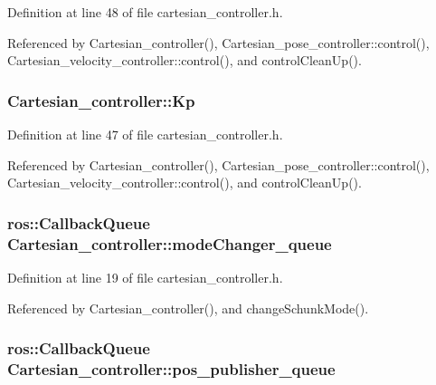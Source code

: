 Definition at line 48 of file cartesian\-\_\-controller.\-h.



Referenced by Cartesian\-\_\-controller(), Cartesian\-\_\-pose\-\_\-controller\-::control(), Cartesian\-\_\-velocity\-\_\-controller\-::control(), and control\-Clean\-Up().

\hypertarget{classCartesian__controller_a78073f51064a05d72c41723a93d9079f}{
\subsubsection[{Kp}]{ Cartesian\-\_\-controller\-::\-Kp\hspace{0.3cm}{\ttfamily [protected]}}}\label{classCartesian__controller_a78073f51064a05d72c41723a93d9079f}


Definition at line 47 of file cartesian\-\_\-controller.\-h.



Referenced by Cartesian\-\_\-controller(), Cartesian\-\_\-pose\-\_\-controller\-::control(), Cartesian\-\_\-velocity\-\_\-controller\-::control(), and control\-Clean\-Up().

\hypertarget{classCartesian__controller_adf47dc3a09bd9650015b25870054b60d}{
\subsubsection[{mode\-Changer\-\_\-queue}]{\setlength{\rightskip}{0pt plus 5cm}ros\-::\-Callback\-Queue Cartesian\-\_\-controller\-::mode\-Changer\-\_\-queue\hspace{0.3cm}{\ttfamily [protected]}}}\label{classCartesian__controller_adf47dc3a09bd9650015b25870054b60d}


Definition at line 19 of file cartesian\-\_\-controller.\-h.



Referenced by Cartesian\-\_\-controller(), and change\-Schunk\-Mode().

\hypertarget{classCartesian__controller_adbb9cddf4092cba9042294740c5371eb}{
\subsubsection[{pos\-\_\-publisher\-\_\-queue}]{\setlength{\rightskip}{0pt plus 5cm}ros\-::\-Callback\-Queue Cartesian\-\_\-controller\-::pos\-\_\-publisher\-\_\-queue\hspace{0.3cm}{\ttfamily [protected]}}}\label{classCartesian__controller_adbb9cddf4092cba9042294740c5371eb}



